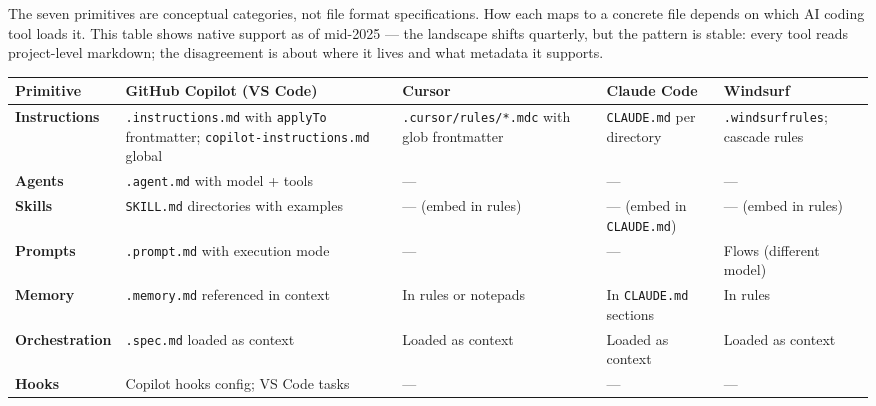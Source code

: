 \documentclass[
  a4paper,
  DIV=11,
  numbers=noendperiod]{scrreprt}
\newcounter{none} %
\begin{document}
The seven primitives are conceptual categories, not file format
specifications. How each maps to a concrete file depends on which AI
coding tool loads it. This table shows native support as of mid-2025 ---
the landscape shifts quarterly, but the pattern is stable: every tool
reads project-level markdown; the disagreement is about where it lives
and what metadata it supports.

{\def\LTcaptype{none} %
\begin{longtable}[]{@{}
  >{\raggedright\arraybackslash}p{}
  >{\raggedright\arraybackslash}p{}
  >{\raggedright\arraybackslash}p{}
  >{\raggedright\arraybackslash}p{}
  >{\raggedright\arraybackslash}p{}@{}}
\toprule\noalign{}
\begin{minipage}[b]{\linewidth}\raggedright
Primitive
\end{minipage} & \begin{minipage}[b]{\linewidth}\raggedright
GitHub Copilot (VS Code)
\end{minipage} & \begin{minipage}[b]{\linewidth}\raggedright
Cursor
\end{minipage} & \begin{minipage}[b]{\linewidth}\raggedright
Claude Code
\end{minipage} & \begin{minipage}[b]{\linewidth}\raggedright
Windsurf
\end{minipage} \\
\midrule\noalign{}
\endhead
\bottomrule\noalign{}
\endlastfoot
\textbf{Instructions} & \texttt{.instructions.md} with \texttt{applyTo}
frontmatter; \texttt{copilot-instructions.md} global &
\texttt{.cursor/rules/*.mdc} with glob frontmatter & \texttt{CLAUDE.md}
per directory & \texttt{.windsurfrules}; cascade rules \\
\textbf{Agents} & \texttt{.agent.md} with model + tools & --- & --- &
--- \\
\textbf{Skills} & \texttt{SKILL.md} directories with examples & ---
(embed in rules) & --- (embed in \texttt{CLAUDE.md}) & --- (embed in
rules) \\
\textbf{Prompts} & \texttt{.prompt.md} with execution mode & --- & --- &
Flows (different model) \\
\textbf{Memory} & \texttt{.memory.md} referenced in context & In rules
or notepads & In \texttt{CLAUDE.md} sections & In rules \\
\textbf{Orchestration} & \texttt{.spec.md} loaded as context & Loaded as
context & Loaded as context & Loaded as context \\
\textbf{Hooks} & Copilot hooks config; VS Code tasks & --- & --- &
--- \\
\end{longtable}
}
\end{document}
